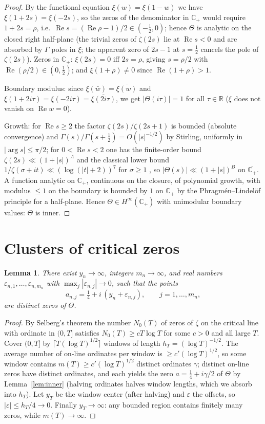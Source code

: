 \documentclass[11pt]{amsart}
\newtheorem{lemma}[theorem]{Lemma}
\theoremstyle{remark}
\newcommand{\Cp}{\mathbb{C}_{+}}
\newcommand{\R}{\mathbb{R}}
\newcommand{\Hinf}{H^{\infty}(\Cp)}
\newcommand{\re}{\operatorname{Re}}
\begin{document}
\begin{proof}
By the functional equation $\xi(w)=\xi(1-w)$ we have
$\xi(1+2s)=\xi(-2s)$, so the zeros of the denominator in $\Cp$ would
require $1+2s=\rho$, i.e.\ $\re s=(\re\rho-1)/2\in(-\tfrac12,0)$;
hence $\Theta$ is analytic on the closed right half-plane (the trivial
zeros of $\zeta(2s)$ lie at $\re s<0$ and are absorbed by $\Gamma$
poles in $\xi$; the apparent zero of $2s-1$ at $s=\tfrac12$ cancels the
pole of $\zeta(2s)$). Zeros in $\Cp$: $\xi(2s)=0$ iff $2s=\rho$, giving
$s=\rho/2$ with $\re(\rho/2)\in(0,\tfrac12)$; and
$\xi(1+\rho)\neq0$ since $\re(1+\rho)>1$.

Boundary modulus: since $\xi(\bar w)=\overline{\xi(w)}$ and
$\xi(1+2i\tau)=\xi(-2i\tau)=\overline{\xi(2i\tau)}$, we get
$|\Theta(i\tau)|=1$ for all $\tau\in\R$ ($\xi$ does not vanish on
$\re w=0$).

Growth: for $\re s\ge 2$ the factor $\zeta(2s)/\zeta(2s+1)$ is bounded
(absolute convergence) and $\Gamma(s)/\Gamma(s+\tfrac12)=O(|s|^{-1/2})$
by Stirling, uniformly in $|\arg s|\le\pi/2$; for $0<\re s<2$ one has
the finite-order bound $\zeta(2s)\ll(1+|s|)^{A}$ and the classical
lower bound $1/\zeta(\sigma+it)\ll(\log(|t|+2))^{7}$ for $\sigma\ge1$
\cite[Ch.~3]{Titchmarsh}, so $|\Theta(s)|\ll(1+|s|)^{B}$ on
$\overline{\Cp}$. A function analytic on $\Cp$, continuous on the
closure, of polynomial growth, with modulus $\le1$ on the boundary is
bounded by $1$ on $\Cp$ by the Phragm\'en--Lindel\"of principle for a
half-plane. Hence $\Theta\in\Hinf$ with unimodular boundary values:
$\Theta$ is inner.
\end{proof}

\section{Clusters of critical zeros}

\begin{lemma}\label{lem:clusters}
There exist $y_{n}\to\infty$, integers $m_{n}\to\infty$, and real
numbers $\varepsilon_{n,1},\dots,\varepsilon_{n,m_{n}}$ with
$\max_{j}|\varepsilon_{n,j}|\to0$, such that the points
\[
  a_{n,j}=\tfrac14+i\,(y_{n}+\varepsilon_{n,j}),
  \qquad j=1,\dots,m_{n},
\]
are distinct zeros of $\Theta$.
\end{lemma}

\begin{proof}
By Selberg's theorem \cite{Selberg} the number $N_{0}(T)$ of zeros of
$\zeta$ on the critical line with ordinate in $(0,T]$ satisfies
$N_{0}(T)\ge cT\log T$ for some $c>0$ and all large $T$. Cover $(0,T]$
by $\lceil T(\log T)^{1/2}\rceil$ windows of length
$h_{T}=(\log T)^{-1/2}$. The average number of on-line ordinates per
window is $\ge c'(\log T)^{1/2}$, so some window contains
$m(T)\ge c'(\log T)^{1/2}$ distinct ordinates
$\gamma$; distinct on-line zeros have distinct ordinates, and each
yields the zero $a=\tfrac14+i\gamma/2$ of $\Theta$ by
Lemma~\ref{lem:inner} (halving ordinates halves window lengths, which
we absorb into $h_{T}$). Let $y_{T}$ be the window center (after
halving) and $\varepsilon$ the offsets, so
$|\varepsilon|\le h_{T}/4\to0$. Finally $y_{T}\to\infty$: any bounded
region contains finitely many zeros, while $m(T)\to\infty$.
\end{proof}
\end{document}
